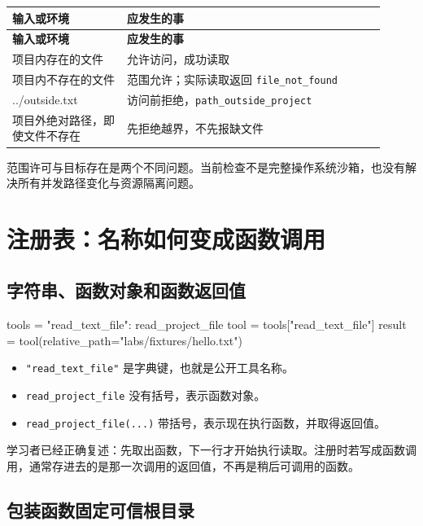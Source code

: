 {\small\setlength{\tabcolsep}{4pt}
\renewcommand{\arraystretch}{1.25}
\begin{longtable}{>{\raggedright\arraybackslash}p{0.28\linewidth}>{\raggedright\arraybackslash}p{0.63\linewidth}}
\toprule
\textbf{输入或环境} & \textbf{应发生的事} \\
\midrule\endfirsthead
\toprule
\textbf{输入或环境} & \textbf{应发生的事} \\
\midrule\endhead
\bottomrule\endfoot
项目内存在的文件 & 允许访问，成功读取 \\
项目内不存在的文件 & 范围允许；实际读取返回 \nolinkurl{file_not_found} \\
../outside.txt & 访问前拒绝，\nolinkurl{path_outside_project} \\
项目外绝对路径，即使文件不存在 & 先拒绝越界，不先报缺文件 \\
\end{longtable}}

范围许可与目标存在是两个不同问题。当前检查不是完整操作系统沙箱，也没有解决所有并发路径变化与资源隔离问题。

\section{注册表：名称如何变成函数调用}

\subsection{字符串、函数对象和函数返回值}

\begin{Code}
tools = {"read_text_file": read_project_file}
tool = tools["read_text_file"]
result = tool(relative_path="labs/fixtures/hello.txt")
\end{Code}

\begin{itemize}
\item \nolinkurl{"read_text_file"} 是字典键，也就是公开工具名称。
\item \nolinkurl{read_project_file} 没有括号，表示函数对象。
\item \nolinkurl{read_project_file(...)} 带括号，表示现在执行函数，并取得返回值。
\end{itemize}

学习者已经正确复述：先取出函数，下一行才开始执行读取。注册时若写成函数调用，通常存进去的是那一次调用的返回值，不再是稍后可调用的函数。

\subsection{包装函数固定可信根目录}

